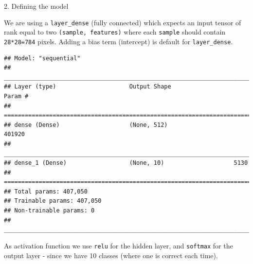 \documentclass[10pt,ignorenonframetext,]{beamer}
\newenvironment{Shaded}{\begin{snugshade}}{\end{snugshade}}
\newcommand{\DataTypeTok}[1]{\textcolor[rgb]{0.13,0.29,0.53}{#1}}
\newcommand{\DecValTok}[1]{\textcolor[rgb]{0.00,0.00,0.81}{#1}}
\newcommand{\KeywordTok}[1]{\textcolor[rgb]{0.13,0.29,0.53}{\textbf{#1}}}
\newcommand{\NormalTok}[1]{#1}
\newcommand{\OperatorTok}[1]{\textcolor[rgb]{0.81,0.36,0.00}{\textbf{#1}}}
\newcommand{\StringTok}[1]{\textcolor[rgb]{0.31,0.60,0.02}{#1}}
\begin{document}
\begin{frame}[fragile]

\begin{block}{2. Defining the model}

\vspace{2mm}

We are using a \texttt{layer\_dense} (fully connected) which expects an
input tensor of rank equal to two \texttt{(sample,\ features)} where
each \texttt{sample} should contain \texttt{28*28=784} pixels. Adding a
bias term (intercept) is default for \texttt{layer\_dense}.

\scriptsize

\begin{Shaded}
\end{Shaded}

\begin{verbatim}
## Model: "sequential"
## ___________________________________________________________________________
## Layer (type)                     Output Shape                  Param #     
## ===========================================================================
## dense (Dense)                    (None, 512)                   401920      
## ___________________________________________________________________________
## dense_1 (Dense)                  (None, 10)                    5130        
## ===========================================================================
## Total params: 407,050
## Trainable params: 407,050
## Non-trainable params: 0
## ___________________________________________________________________________
\end{verbatim}

\vspace{2mm}

\normalsize

As activation function we use \texttt{relu} for the hidden layer, and
\texttt{softmax} for the output layer - since we have 10 classes (where
one is correct each time).

\end{block}

\end{frame}
\end{document}
